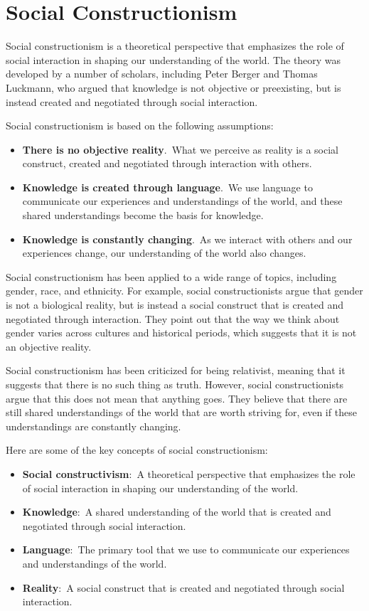 \documentclass[
]{book}
\begin{document}
\section{Social Constructionism}\label{social-constructionism}

Social constructionism is a theoretical perspective that emphasizes the role of social interaction in shaping our understanding of the world. The theory was developed by a number of scholars, including Peter Berger and Thomas Luckmann, who argued that knowledge is not objective or preexisting, but is instead created and negotiated through social interaction.

Social constructionism is based on the following assumptions:

\begin{itemize}
\item
  \textbf{There is no objective reality}.~What we perceive as reality is a social construct, created and negotiated through interaction with others.
\item
  \textbf{Knowledge is created through language}.~We use language to communicate our experiences and understandings of the world, and these shared understandings become the basis for knowledge.
\item
  \textbf{Knowledge is constantly changing}.~As we interact with others and our experiences change, our understanding of the world also changes.
\end{itemize}

Social constructionism has been applied to a wide range of topics, including gender, race, and ethnicity. For example, social constructionists argue that gender is not a biological reality, but is instead a social construct that is created and negotiated through interaction. They point out that the way we think about gender varies across cultures and historical periods, which suggests that it is not an objective reality.

Social constructionism has been criticized for being relativist, meaning that it suggests that there is no such thing as truth. However, social constructionists argue that this does not mean that anything goes. They believe that there are still shared understandings of the world that are worth striving for, even if these understandings are constantly changing.

Here are some of the key concepts of social constructionism:

\begin{itemize}
\item
  \textbf{Social constructivism}:~A theoretical perspective that emphasizes the role of social interaction in shaping our understanding of the world.
\item
  \textbf{Knowledge}:~A shared understanding of the world that is created and negotiated through social interaction.
\item
  \textbf{Language}:~The primary tool that we use to communicate our experiences and understandings of the world.
\item
  \textbf{Reality}:~A social construct that is created and negotiated through social interaction.
\end{itemize}
\end{document}
